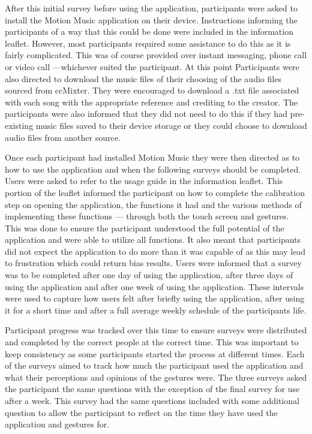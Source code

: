\documentclass{l4proj}
\begin{document}
After this initial survey before using the application, participants were asked to install the Motion Music application on their device. Instructions informing the participants of a way that this could be done were included in the information leaflet. However, most participants required some assistance to do this as it is fairly complicated. This was of course provided over instant messaging, phone call or video call ---whichever suited the participant. At this point Participants were also directed to download the music files of their choosing of the audio files sourced from ccMixter. They were encouraged to download a .txt file associated with each song with the appropriate reference and crediting to the creator. The participants were also informed that they did not need to do this if they had pre-existing music files saved to their device storage or they could choose to download audio files from another source.

Once each participant had installed Motion Music they were then directed as to how to use the application and when the following surveys should be completed. Users were asked to refer to the usage guide in the information leaflet. This portion of the leaflet informed the participant on how to complete the calibration step on opening the application, the functions it had and the various methods of implementing these functions --- through both the touch screen and gestures. This was done to ensure the participant understood the full potential of the application and were able to utilize all functions. It also meant that participants did not expect the application to do more than it was capable of as this may lead to frustration which could return bias results. Users were informed that a survey was to be completed after one day of using the application, after three days of using the application and after one week of using the application. These intervals were used to capture how users felt after briefly using the application, after using it for a short time and after a full average weekly schedule of the participants life. 

Participant progress was tracked over this time to ensure surveys were distributed and completed by the correct people at the correct time. This was important to keep consistency as some participants started the process at different times. Each of the surveys aimed to track how much the participant used the application and what their perceptions and opinions of the gestures were. The three surveys asked the participant the same questions with the exception of the final survey for use after a week. This survey had the same questions included with some additional question to allow the participant to reflect on the time they have used the application and gestures for.
\end{document}

